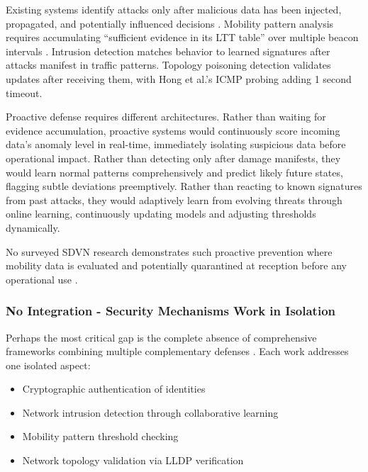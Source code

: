 \documentclass[12pt, a4paper]{report}
\begin{document}
Existing systems identify attacks only after malicious data has been injected, propagated, and potentially influenced decisions \cite{ghaleb2014,raja2021,hong2015}. Mobility pattern analysis requires accumulating ``sufficient evidence in its LTT table'' over multiple beacon intervals \cite{ghaleb2014}. Intrusion detection matches behavior to learned signatures after attacks manifest in traffic patterns. Topology poisoning detection validates updates after receiving them, with Hong et al.'s ICMP probing adding 1 second timeout.

Proactive defense requires different architectures. Rather than waiting for evidence accumulation, proactive systems would continuously score incoming data's anomaly level in real-time, immediately isolating suspicious data before operational impact. Rather than detecting only after damage manifests, they would learn normal patterns comprehensively and predict likely future states, flagging subtle deviations preemptively. Rather than reacting to known signatures from past attacks, they would adaptively learn from evolving threats through online learning, continuously updating models and adjusting thresholds dynamically.

No surveyed SDVN research demonstrates such proactive prevention where mobility data is evaluated and potentially quarantined at reception before any operational use \cite{bhatia2019,arif2020}.

\subsubsection{No Integration - Security Mechanisms Work in Isolation}
\label{subsec:no-integration}

Perhaps the most critical gap is the complete absence of comprehensive frameworks combining multiple complementary defenses \cite{bhatia2019,ravi2023}. Each work addresses one isolated aspect:

\begin{itemize}
	\item Cryptographic authentication of identities \cite{raja2021}
	\item Network intrusion detection through collaborative learning \cite{raja2021}
	\item Mobility pattern threshold checking \cite{ghaleb2014}
	\item Network topology validation via LLDP verification \cite{hong2015}
\end{itemize}
\end{document}

